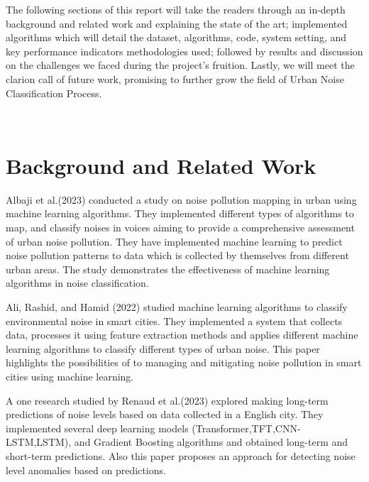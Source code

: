\documentclass[conference]{IEEEtran}
\begin{document}
The following sections of this report will take the readers
through an in-depth background and related work and explaining the state of the art; implemented algorithms which will detail the dataset, algorithms, code, system setting, and key performance indicators 
methodologies used; followed by results and discussion on the
challenges we faced during the project’s fruition. Lastly, we
will meet the clarion call of future work, promising to further
grow the field of Urban Noise Classification Process.

\\

\section{Background and Related Work}
Albaji et al.(2023) conducted a study on noise pollution mapping in urban using machine learning algorithms.\cite{albaji2023investigation} They implemented different types of algorithms to map, and classify noises in voices aiming to provide a comprehensive assessment of urban noise pollution.\cite{tandel2020voice} They have implemented machine learning to predict noise pollution patterns to data which is collected by themselves from different urban areas. The study demonstrates the effectiveness of machine learning algorithms in noise classification.

Ali, Rashid, and Hamid (2022) studied machine learning algorithms to classify environmental noise in smart cities.\cite{r1} They implemented a system that collects data, processes it using feature extraction methods and applies different machine learning algorithms to classify different types of urban noise. This paper highlights the possibilities of to managing and mitigating noise pollution in smart cities using machine learning.\cite{boonprong2018classification}

A one research studied by Renaud et al.(2023) explored making long-term predictions of noise levels based on data collected in a English city. They implemented several deep learning models (Transformer,TFT,CNN-LSTM,LSTM), and Gradient Boosting algorithms and obtained long-term and short-term predictions. Also this paper proposes an approach for detecting noise level anomalies based on predictions. \cite{RENAUD2023119568}
\end{document}
